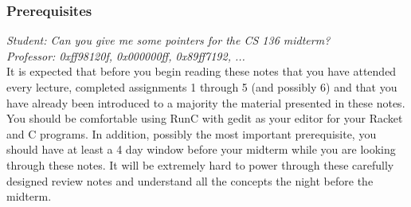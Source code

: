 \subsubsection*{Prerequisites}

\textit{Student: Can you give me some pointers for the CS 136 midterm?}\\
\textit{Professor: 0xff98120f, 0x000000ff, 0x89ff7192, ...}\\

It is expected that before you begin reading these notes that you have attended every lecture, completed assignments 1 through 5 (and possibly 6) and that you have already been introduced to a majority the material presented in these notes.\\

You should be comfortable using RunC with gedit as your editor for your Racket and C programs. In addition, possibly the most important prerequisite, you should have at least a 4 day window before your midterm while you are looking through these notes. It will be extremely hard to power through these carefully designed review notes and understand all the concepts the night before the midterm.